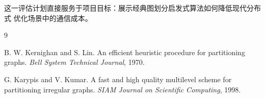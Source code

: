 \documentclass[UTF8, 11pt]{ctexart}
\begin{document}
这一评估计划直接服务于项目目标：展示经典图划分启发式算法如何降低现代分布式
优化场景中的通信成本。

\begin{thebibliography}{9}

B. W. Kernighan and S. Lin.
\newblock An efficient heuristic procedure for partitioning graphs.
\newblock \emph{Bell System Technical Journal}, 1970.

G. Karypis and V. Kumar.
\newblock A fast and high quality multilevel scheme for partitioning irregular graphs.
\newblock \emph{SIAM Journal on Scientific Computing}, 1998.

\end{thebibliography}
\end{document}
